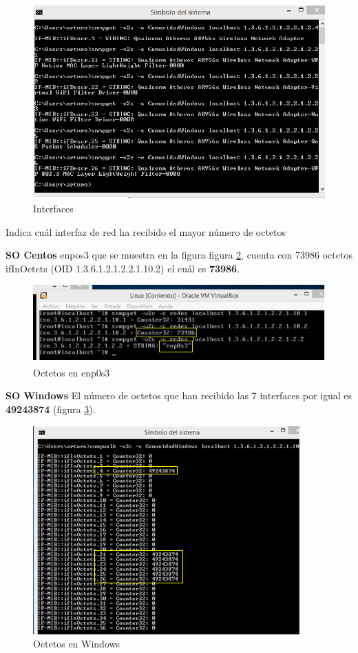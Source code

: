 \FloatBarrier
\begin{figure}[htbp!]
		\centering
		    \includegraphics[width=.7 \textwidth]{../images/Pregunta4W2.png} 
		\caption{Interfaces}
		\label{image:Pregunta4W2}
\end{figure}
\FloatBarrier

\item Indica cuál interfaz de red ha recibido el mayor número de octetos

\textbf{SO Centos}
enpos3 que se muestra en la figura figura \ref{image:Pregunta5C}, cuenta con 73986 octetos ifInOctets (OID 1.3.6.1.2.1.2.2.1.10.2) el cuál es \textbf{73986}.


 \FloatBarrier
\begin{figure}[htbp!]
		\centering
		    \includegraphics[width=.9 \textwidth]{../images/Pregunta5C.png} 
		\caption{Octetos en enp0s3}
		\label{image:Pregunta5C}
\end{figure}
\FloatBarrier

\textbf{SO Windows}
El número de octetos que han recibido las 7 interfaces por igual es \textbf{49243874} (figura  \ref{image:Pregunta5W}).


 \FloatBarrier
\begin{figure}[htbp!]
		\centering
		    \includegraphics[width=.7 \textwidth]{../images/Pregunta5W.png} 
		\caption{Octetos en Windows}
		\label{image:Pregunta5W}
\end{figure}
\FloatBarrier

